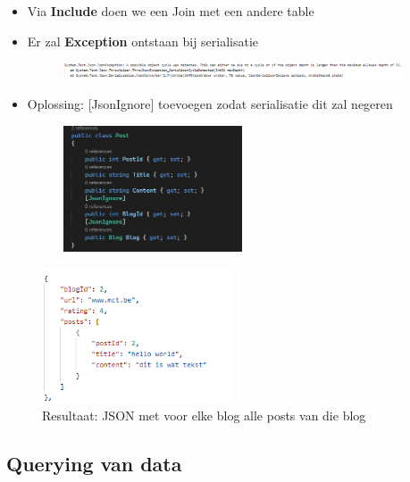 \documentclass{article}
\begin{document}
\begin{itemize}
    \item Via \textbf{Include} doen we een Join met een andere table
    \item Er zal \textbf{Exception} ontstaan bij serialisatie
    \begin{figure}[H]
        \centering
        \includegraphics[width=0.95\textwidth]{efcore-select-related2.png}
        \caption{}
    \end{figure}
    
    \item Oplossing: [JsonIgnore] toevoegen zodat serialisatie dit zal negeren
    \begin{figure}[H]
        \centering
        \includegraphics[width=0.5\textwidth]{efcore-select-related-jsonignore.png}
        \caption{}
    \end{figure}
\end{itemize}

\begin{figure}[H]
    \centering
    \includegraphics[width=0.5\textwidth]{efcore-select-related-result.png}
    \caption{Resultaat: JSON met voor elke blog alle posts van die blog}
\end{figure}


\subsection{Querying van data}
\end{document}
